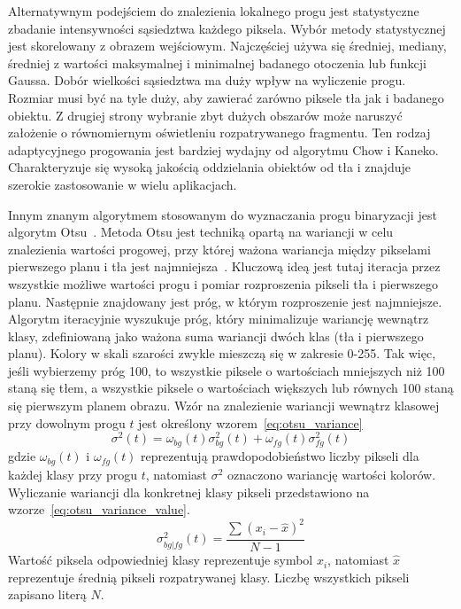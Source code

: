 Alternatywnym podejściem do znalezienia lokalnego progu jest statystyczne zbadanie intensywności sąsiedztwa każdego piksela.
Wybór metody statystycznej jest skorelowany z obrazem wejściowym.
Najczęściej używa się średniej, mediany, średniej z wartości maksymalnej i minimalnej badanego otoczenia lub funkcji Gaussa.
Dobór wielkości sąsiedztwa ma duży wpływ na wyliczenie progu.
Rozmiar musi być na tyle duży, aby zawierać zarówno piksele tła jak i badanego obiektu.
Z drugiej strony wybranie zbyt dużych obszarów może naruszyć założenie o równomiernym oświetleniu rozpatrywanego fragmentu.
Ten rodzaj adaptycyjnego progowania jest bardziej wydajny od algorytmu Chow i Kaneko.
Charakteryzuje się wysoką jakością oddzielania obiektów od tła i znajduje szerokie zastosowanie w wielu aplikacjach.

Innym znanym algorytmem stosowanym do wyznaczania progu binaryzacji jest algorytm Otsu~\cite{4310076}.
Metoda Otsu jest techniką opartą na wariancji w celu znalezienia wartości progowej, przy której ważona wariancja między pikselami pierwszego planu i tła jest najmniejsza~\cite{otsu_article}.
Kluczową ideą jest tutaj iteracja przez wszystkie możliwe wartości progu i pomiar rozproszenia pikseli tła i pierwszego planu.
Następnie znajdowany jest próg, w którym rozproszenie jest najmniejsze.
Algorytm iteracyjnie wyszukuje próg, który minimalizuje wariancję wewnątrz klasy, zdefiniowaną jako ważona suma wariancji dwóch klas (tła i pierwszego planu).
Kolory w skali szarości zwykle mieszczą się w zakresie 0-255.
Tak więc, jeśli wybierzemy próg 100, to wszystkie piksele o wartościach mniejszych niż 100 staną się tłem, a wszystkie piksele o wartościach większych lub równych 100 staną się pierwszym planem obrazu.
Wzór na znalezienie wariancji wewnątrz klasowej przy dowolnym progu $t$ jest określony wzorem~\eqref{eq:otsu_variance}
\begin{equation}
    \label{eq:otsu_variance}
    \sigma^2(t)=\omega_{bg}(t)\sigma_{bg}^2(t)+\omega_{fg}(t)\sigma_{fg}^2(t)
\end{equation}
gdzie $\omega_{bg}(t)$ i $\omega_{fg}(t)$ reprezentują prawdopodobieństwo liczby pikseli dla każdej klasy przy progu $t$, natomiast $\sigma^2$ oznaczono wariancję wartości kolorów.
Wyliczanie wariancji dla konkretnej klasy pikseli przedstawiono na wzorze~\eqref{eq:otsu_variance_value}.
\begin{equation}
    \label{eq:otsu_variance_value}
    \sigma_{bg | fg}^2(t)=\dfrac{\sum_{}^{}(x_i-\hat{x})^2}{N-1}
\end{equation}
Wartość piksela odpowiedniej klasy reprezentuje symbol $x_i$, natomiast $\hat{x}$ reprezentuje średnią pikseli rozpatrywanej klasy.
Liczbę wszystkich pikseli zapisano literą $N$.

